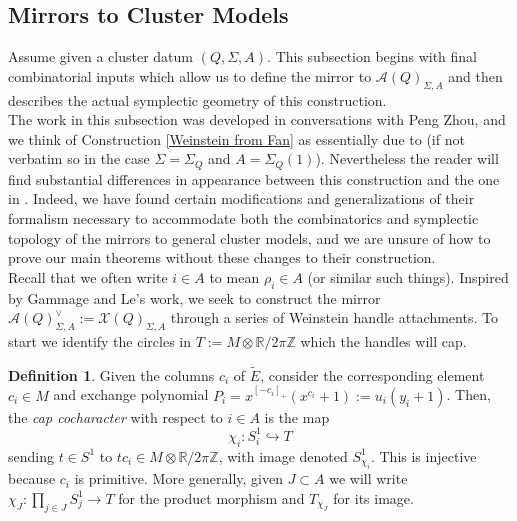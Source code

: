 \documentclass[11pt]{amsart}
\theoremstyle{definition}
\newtheorem{defn}[thm]{Definition}
\theoremstyle{remark}
\numberwithin{equation}{section}
\begin{document}

\subsection{Mirrors to Cluster Models}

Assume given a cluster datum $(Q, \Sigma, A)$. This subsection begins with final combinatorial inputs which allow us to define the mirror to $\mathcal{A}(Q)_{\Sigma, A}$ and then describes the actual symplectic geometry of this construction.\\

The work in this subsection was developed in conversations with Peng Zhou, and we think of Construction \ref{Weinstein from Fan} as essentially due to \cite{SSWZ} (if not verbatim so in the case $\Sigma = \Sigma_Q$ and $A = \Sigma_Q(1)$). Nevertheless the reader will find substantial differences in appearance between this construction and the one in \cite{SSWZ}. Indeed, we have found certain modifications and generalizations of their formalism necessary to accommodate both the combinatorics and symplectic topology of the mirrors to general cluster models, and we are unsure of how to prove our main theorems without these changes to their construction.\\

Recall that we often write $i \in A$ to mean $\rho_i \in A$ (or similar such things). Inspired by Gammage and Le's work, we seek to construct the mirror $\mathcal{A}(Q)_{\Sigma, A}^\vee := \mathcal{X}(Q)_{\Sigma, A}$ through a series of Weinstein handle attachments. To start we identify the circles in $T := M\otimes\mathbb R/2\pi\mathbb Z$ which the handles will cap.

\begin{defn}
    Given the columns $c_i$ of $\tilde{E}$, consider the corresponding element $c_i \in M$ and exchange polynomial $P_i = x^{[-c_i]_+}(x^{c_i} + 1) := u_i(y_i + 1)$. Then, the \textit{cap cocharacter} with respect to $i \in A$ is the map $$\chi_i: S^1_i \hookrightarrow T$$ \noindent sending $t \in S^1$ to $tc_i \in M \otimes \mathbb{R}/2\pi\mathbb
    Z$, with image denoted $S^1_{\chi_i}$. This is injective because $c_i$ is primitive. More generally, given $J \subset A$ we will write $\chi_J: \prod_{j \in J} S^1_j \rightarrow T$ for the product morphism and $T_{\chi_J}$ for its image.
\end{defn}
\end{document}
